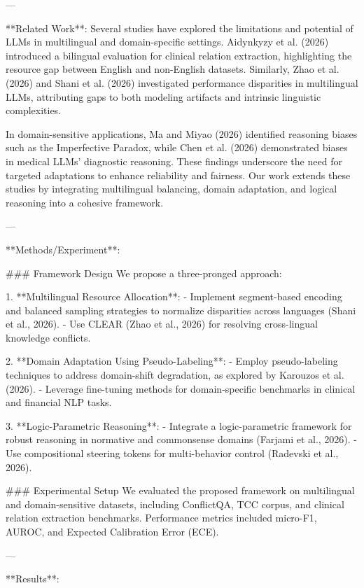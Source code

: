 ---

**Related Work**:  
Several studies have explored the limitations and potential of LLMs in multilingual and domain-specific settings. Aidynkyzy et al. (2026) introduced a bilingual evaluation for clinical relation extraction, highlighting the resource gap between English and non-English datasets. Similarly, Zhao et al. (2026) and Shani et al. (2026) investigated performance disparities in multilingual LLMs, attributing gaps to both modeling artifacts and intrinsic linguistic complexities.

In domain-sensitive applications, Ma and Miyao (2026) identified reasoning biases such as the Imperfective Paradox, while Chen et al. (2026) demonstrated biases in medical LLMs' diagnostic reasoning. These findings underscore the need for targeted adaptations to enhance reliability and fairness. Our work extends these studies by integrating multilingual balancing, domain adaptation, and logical reasoning into a cohesive framework.

---

**Methods/Experiment**:  

### Framework Design  
We propose a three-pronged approach: 

1. **Multilingual Resource Allocation**:  
   - Implement segment-based encoding and balanced sampling strategies to normalize disparities across languages (Shani et al., 2026).  
   - Use CLEAR (Zhao et al., 2026) for resolving cross-lingual knowledge conflicts.  

2. **Domain Adaptation Using Pseudo-Labeling**:  
   - Employ pseudo-labeling techniques to address domain-shift degradation, as explored by Karouzos et al. (2026).  
   - Leverage fine-tuning methods for domain-specific benchmarks in clinical and financial NLP tasks.  

3. **Logic-Parametric Reasoning**:  
   - Integrate a logic-parametric framework for robust reasoning in normative and commonsense domains (Farjami et al., 2026).  
   - Use compositional steering tokens for multi-behavior control (Radevski et al., 2026).  

### Experimental Setup  
We evaluated the proposed framework on multilingual and domain-sensitive datasets, including ConflictQA, TCC corpus, and clinical relation extraction benchmarks. Performance metrics included micro-F1, AUROC, and Expected Calibration Error (ECE).  

---

**Results**:  

